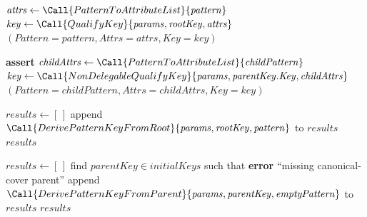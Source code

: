 \begin{algorithm}[t]
\caption{WKD-IBE key derivation}
\begin{algorithmic}[1]
    \State $\mathit{attrs} \gets \Call{PatternToAttributeList}{\mathit{pattern}}$
    \State $\mathit{key} \gets \Call{QualifyKey}{\mathit{params}, \mathit{rootKey}, \mathit{attrs}}$
    \State \Return $(\mathit{Pattern}=\mathit{pattern}, \mathit{Attrs}=\mathit{attrs}, \mathit{Key}=\mathit{key})$
\EndProcedure

    \State \textbf{assert} 
    \State $\mathit{childAttrs} \gets \Call{PatternToAttributeList}{\mathit{childPattern}}$
    \State $\mathit{key} \gets \Call{NonDelegableQualifyKey}{\mathit{params}, \mathit{parentKey}.\mathit{Key}, \mathit{childAttrs}}$
    \State \Return $(\mathit{Pattern}=\mathit{childPattern}, \mathit{Attrs}=\mathit{childAttrs}, \mathit{Key}=\mathit{key})$
\EndProcedure

    \State $\mathit{results} \gets [\,]$
        \State append $\Call{DerivePatternKeyFromRoot}{\mathit{params}, \mathit{rootKey}, \mathit{pattern}}$ to $\mathit{results}$
    \EndFor
    \State \Return $\mathit{results}$
\EndProcedure

    \State $\mathit{results} \gets [\,]$
        \State find $\mathit{parentKey} \in \mathit{initialKeys}$ such that
        \Statex \hspace{\algorithmicindent} 
            \State \textbf{error} ``missing canonical-cover parent''
        \EndIf
        \State append $\Call{DerivePatternKeyFromParent}{\mathit{params}, \mathit{parentKey}, \mathit{emptyPattern}}$ to $\mathit{results}$
    \EndFor
    \State \Return $\mathit{results}$
\EndProcedure
\end{algorithmic}
\end{algorithm}

